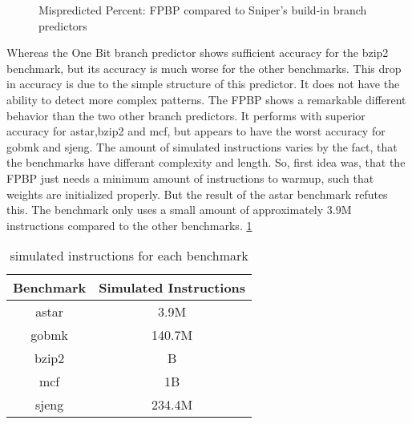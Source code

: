 \documentclass{article}
\begin{document}
\begin{figure}[H]
\caption{Mispredicted Percent: FPBP compared to Sniper's\cite{carlson2014aeohmcm} build-in branch predictors}
\end{figure}
Whereas the One Bit branch predictor shows sufficient accuracy for the \textsf{bzip2} benchmark, but its accuracy is much worse for the other benchmarks. This drop in accuracy is due to the simple structure of this predictor. It does not have the ability to detect more complex patterns. The FPBP shows a remarkable different behavior than the two other branch predictors. It performs with superior accuracy for \textsf{astar},\textsf{bzip2} and \textsf{mcf}, but appears to have the worst accuracy for \textsf{gobmk} and \textsf{sjeng}. 
The amount of simulated instructions varies by the fact, that the benchmarks have differant complexity and length. So, first idea was, that the FPBP just needs a minimum amount of instructions to warmup, such that weights are initialized properly.
But the result of the \textsf{astar} benchmark refutes this. The benchmark only uses a small amount of approximately $3.9\text{M}$ instructions compared to the other benchmarks. \ref{tab:instructions}

\begin{table}[H]
	\centering
\begin{tabular}{cc}
	\textbf{Benchmark} & \textbf{Simulated Instructions} \\
	\hline
	astar &  3.9M\\
	gobmk & 140.7M\\
	bzip2 & B\\
	mcf & 1B\\
	sjeng & 234.4M
\end{tabular}
\caption{simulated instructions for each benchmark}
\label{tab:instructions}
\end{table}
\end{document}
